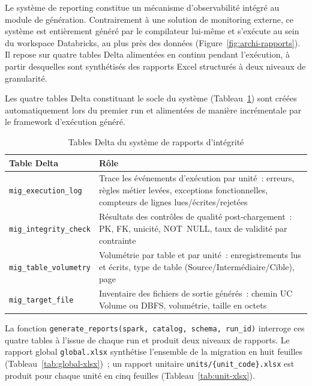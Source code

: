 Le système de reporting constitue un mécanisme d'observabilité intégré au module de génération. Contrairement à une solution de monitoring externe, ce système est entièrement généré par le compilateur lui-même et s'exécute au sein du workspace Databricks, au plus près des données (Figure~\ref{fig:archi-rapports}). Il repose sur quatre tables Delta alimentées en continu pendant l'exécution, à partir desquelles sont synthétisés des rapports Excel structurés à deux niveaux de granularité.



Les quatre tables Delta constituant le socle du système (Tableau~\ref{tab:delta-tables}) sont créées automatiquement lors du premier run et alimentées de manière incrémentale par le framework d'exécution généré.

\begin{table}[H]
\centering
\caption{Tables Delta du système de rapports d'intégrité}
\label{tab:delta-tables}
\begin{tabularx}{\textwidth}{lX}
\toprule
\textbf{Table Delta} & \textbf{Rôle} \\
\midrule
\texttt{mig\_execution\_log} &
  Trace les événements d'exécution par unité~: erreurs, règles métier levées, exceptions fonctionnelles, compteurs de lignes lues/écrites/rejetées \\
\addlinespace
\texttt{mig\_integrity\_check} &
  Résultats des contrôles de qualité post-chargement~: PK, FK, unicité, NOT~NULL, taux de validité par contrainte \\
\addlinespace
\texttt{mig\_table\_volumetry} &
  Volumétrie par table et par unité~: enregistrements lus et écrits, type de table (Source/Intermédiaire/Cible), page \\
\addlinespace
\texttt{mig\_target\_file} &
  Inventaire des fichiers de sortie générés~: chemin UC Volume ou DBFS, volumétrie, taille en octets \\
\bottomrule
\end{tabularx}
\end{table}

La fonction \texttt{generate\_reports(spark, catalog, schema, run\_id)} interroge ces quatre tables à l'issue de chaque run et produit deux niveaux de rapports. Le rapport global \texttt{global.xlsx} synthétise l'ensemble de la migration en huit feuilles (Tableau~\ref{tab:global-xlsx})~; un rapport unitaire \texttt{units/\{unit\_code\}.xlsx} est produit pour chaque unité en cinq feuilles (Tableau~\ref{tab:unit-xlsx}).

